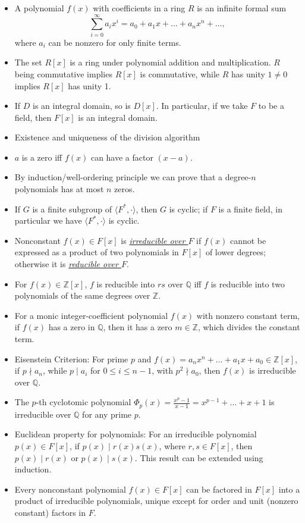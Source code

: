\documentclass{article}
\newcommand{\df}[1]{\ul{\textit{#1}}}
\newcommand{\Z}{\mathbb{Z}}
\newcommand{\Q}{\mathbb{Q}}
\newcommand{\la}{\langle}
\newcommand{\ra}{\rangle}
\begin{document}
\begin{itemize}
    \item A polynomial $f(x)$ with coefficients in a ring $R$ is an infinite formal sum $$\sum_{i=0}^\infty a_i x^i = a_0 + a_1 x + \dots + a_n x^n + \dots,$$ where $a_i$ can be nonzero for only finite terms.
    

    
    \item The set $R[x]$ is a ring under polynomial addition and multiplication. $R$ being commutative implies $R[x]$ is commutative, while $R$ has unity $1 \not= 0$ implies $R[x]$ has unity 1.
    \item If $D$ is an integral domain, so is $D[x]$. In particular, if we take $F$ to be a field, then $F[x]$ is an integral domain.
    
    
    \item Existence and uniqueness of the division algorithm
    \item $a$ is a zero iff $f(x)$ can have a factor $(x-a)$.
    \item By induction/well-ordering principle we can prove that a degree-$n$ polynomials has at most $n$ zeros.
    \item If $G$ is a finite subgroup of $\la F^*, \cdot \ra$, then $G$ is cyclic; if $F$ is a finite field, in particular we have $\la F^*, \cdot \ra$ is cyclic.
    \item Nonconstant $f(x) \in F[x]$ is \df{irreducible over $F$} if $f(x)$ cannot be expressed as a product of two polynomials in $F[x]$ of lower degrees; otherwise it is \df{reducible over $F$}.
    \item For $f(x) \in \Z[x]$, $f$ is reducible into $rs$ over $\Q$ iff $f$ is reducible into two polynomials of the same degrees over $\Z$.
    \item For a monic integer-coefficient polynomial $f(x)$ with nonzero constant term, if $f(x)$ has a zero in $\Q$, then it has a zero $m \in \Z$, which divides the constant term.
    \item Eisenstein Criterion: For prime $p$ and $f(x) = a_n x^n + \dots + a_1 x + a_0 \in \Z[x]$, if $p \nmid a_n$, while $p \mid a_i$ for $0 \leq i \leq n-1$, with $p^2 \nmid a_0$, then $f(x)$ is irreducible over $\Q$.
    \item The $p$-th cyclotomic polynomial $\Phi_p(x) = \frac{x^p - 1}{x - 1} = x^{p-1} + \dots + x + 1$ is irreducible over $\Q$ for any prime $p$.
    \item Euclidean property for polynomials: For an irreducible polynomial $p(x) \in F[x]$, if $p(x) \mid r(x)s(x)$, where $r,s \in F[x]$, then $p(x) \mid r(x)$ or $p(x) \mid s(x)$. This result can be extended using induction.
    \item Every nonconstant polynomial $f(x) \in F[x]$ can be factored in $F[x]$ into a product of irreducible polynomials, unique except for order and unit (nonzero constant) factors in $F$.
\end{itemize}
\end{document}
